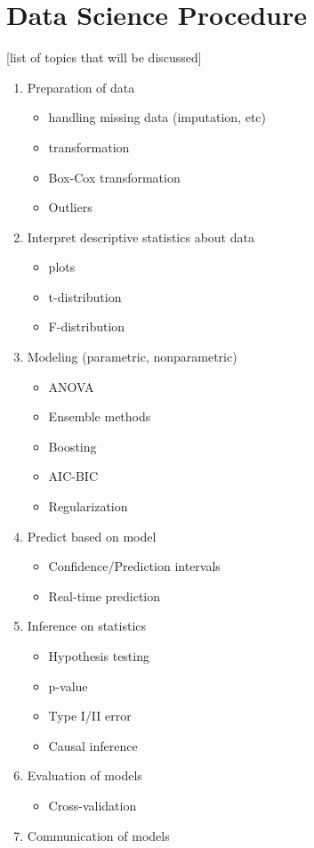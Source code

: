 \documentclass[11pt,reqno]{amsart}
\theoremstyle{remark}
\begin{document}
\section*{Data Science Procedure}[list of topics that will be discussed]
\begin{enumerate}
\item Preparation of data
\begin{itemize}
\item handling missing data (imputation, etc)
\item transformation
\item Box-Cox transformation
\item Outliers
\end{itemize}

\item Interpret descriptive statistics about data
\begin{itemize}
\item plots
\item t-distribution
\item F-distribution
\end{itemize}

\item Modeling (parametric, nonparametric)
\begin{itemize}
\item ANOVA
\item Ensemble methods
\item Boosting
\item AIC-BIC
\item Regularization
\end{itemize}

\item Predict based on model
\begin{itemize}
\item Confidence/Prediction intervals
\item Real-time prediction
\end{itemize}

\item Inference on statistics
\begin{itemize}
\item Hypothesis testing
\item p-value
\item Type I/II error
\item Causal inference
\end{itemize}

\item Evaluation of models
\begin{itemize}
\item Cross-validation
\end{itemize}

\item Communication of models
\end{enumerate}
\end{document}
